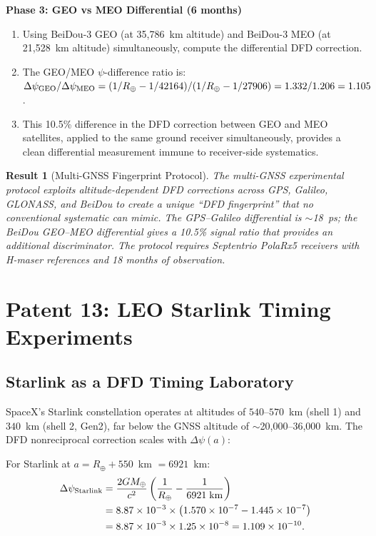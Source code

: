 \documentclass[aps,prd,twocolumn,superscriptaddress,nofootinbib]{revtex4-2}
\newcommand{\Rearth}{R_\oplus}
\newcommand{\Mearth}{M_\oplus}
\newtheorem{result}{Result}
\begin{document}
\textbf{Phase 3: GEO vs MEO Differential (6 months)}

\begin{enumerate}
\item Using BeiDou-3 GEO (at 35,786~km altitude) and BeiDou-3 MEO
(at 21,528~km altitude) simultaneously, compute the differential
DFD correction.

\item The GEO/MEO $\psi$-difference ratio is:
$\Delta\psi_{\rm GEO}/\Delta\psi_{\rm MEO}
= (1/\Rearth - 1/42164)/(1/\Rearth - 1/27906)
= 1.332/1.206 = 1.105$.

\item This 10.5\% difference in the DFD correction between GEO and MEO
satellites, applied to the same ground receiver simultaneously,
provides a clean differential measurement immune to receiver-side
systematics.
\end{enumerate}

\begin{result}[Multi-GNSS Fingerprint Protocol]
The multi-GNSS experimental protocol exploits altitude-dependent
DFD corrections across GPS, Galileo, GLONASS, and BeiDou to create
a unique ``DFD fingerprint'' that no conventional systematic can
mimic. The GPS--Galileo differential is $\sim$18~ps; the BeiDou
GEO--MEO differential gives a 10.5\% signal ratio that provides
an additional discriminator. The protocol requires Septentrio PolaRx5
receivers with H-maser references and 18 months of observation.
\end{result}

\section{Patent 13: LEO Starlink Timing Experiments}
\label{sec:leo}

\subsection{Starlink as a DFD Timing Laboratory}

SpaceX's Starlink constellation operates at altitudes of
$540$--$570$~km (shell 1) and $340$~km (shell 2, Gen2), far below
the GNSS altitude of $\sim$20,000--36,000~km. The DFD nonreciprocal
correction scales with $\Delta\psi(a)$:

For Starlink at $a = \Rearth + 550$~km $= 6921$~km:
\begin{align}
\Delta\psi_{\rm Starlink}
&= \frac{2G\Mearth}{c^2}\left(\frac{1}{\Rearth} - \frac{1}{6921\;\text{km}}\right)
\nonumber\\
&= 8.87\times10^{-3}\times\left(1.570\times10^{-7} - 1.445\times10^{-7}\right)
\nonumber\\
&= 8.87\times10^{-3}\times1.25\times10^{-8} = 1.109\times10^{-10}.
\end{align}
\end{document}

